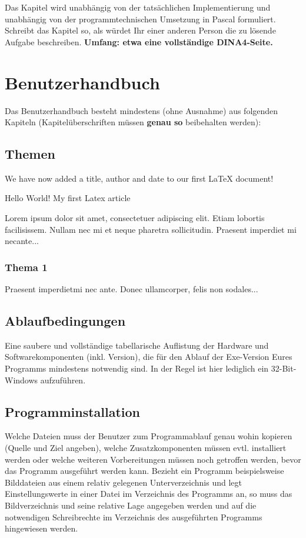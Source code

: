 \documentclass[12pt, letterpaper, twoside]{article}
\begin{document}
            Das Kapitel wird unabhängig von der tatsächlichen Implementierung und unabhängig von
            der programmtechnischen Umsetzung in Pascal formuliert. 
            Schreibt das Kapitel so, als würdet Ihr einer anderen Person die zu lösende Aufgabe beschreiben. 
            \textbf{Umfang: etwa eine vollständige DINA4-Seite.}
    \newpage

    \section{Benutzerhandbuch}
    Das Benutzerhandbuch besteht mindestens
    (ohne Ausnahme) aus folgenden Kapiteln
    (Kapitelüberschriften müssen \textbf{genau so} beibehalten werden): 
            
        \subsection{Themen}
            We have now added a title, author and date to our first \LaTeX{} document!

            Hello World!
            My first Latex article

            Lorem ipsum dolor sit amet, consectetuer adipiscing elit.  
            Etiam lobortis facilisissem.  Nullam nec mi et neque pharetra 
            sollicitudin.  Praesent imperdiet mi necante...

            \subsubsection{Thema 1}
            Praesent imperdietmi nec ante. Donec ullamcorper, felis non sodales...
    
        \subsection{Ablaufbedingungen}
            Eine saubere und vollständige tabellarische Auflistung der Hardware und Softwarekomponenten (inkl. Version),
            die für den Ablauf der Exe-Version Eures Programms mindestens notwendig sind.
            In der Regel ist hier lediglich ein 32-Bit-Windows aufzuführen.

        \subsection{Programminstallation}
            Welche Dateien muss der Benutzer zum Programmablauf genau wohin kopieren (Quelle und Ziel angeben), welche Zusatzkomponenten müssen evtl. installiert werden oder welche weiteren Vorbereitungen müssen noch getroffen werden, bevor das Programm ausgeführt werden kann. Bezieht ein Programm beispielsweise Bilddateien aus einem relativ gelegenen Unterverzeichnis und legt Einstellungswerte in einer Datei im Verzeichnis des Programms an, so muss das Bildverzeichnis und seine relative Lage angegeben werden und auf die notwendigen Schreibrechte im Verzeichnis des ausgeführten Programms hingewiesen werden.
        
\end{document}
